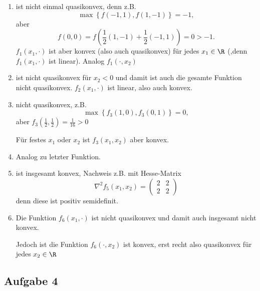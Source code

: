 \begin{enumerate}[label=\underline{f_{\arabic{enumi}}}:]
	\item ist nicht einmal quasikonvex, denn z.B.
		\[
			\max\limits_{}\left\{ f(-1,1), f(1,-1) \right\}  = -1
		,\] 
		aber
		\[
			f(0,0) = f(\frac{1}{2}(1,-1) + \frac{1}{2}(-1,1)) = 0 > -1
		.\] 
	 $f_1(x_1,\cdot)$ ist aber konvex (also auch quasikonvex) für jedes $x_1 \in \R$ (,denn $f_1(x_1, \cdot)$ ist linear). Analog $f_1(\cdot,x_2)$

	 \item ist nicht quasikonvex für $x_2<0$ und damit ist auch die gesamte Funktion nicht quasikonvex.
		 $f_{2}(x_1, \cdot)$ ist linear, also auch konvex.
	\item nicht quasikonvex, z.B.
		\[
			\max\limits_{}\left\{ f_3(1,0), f_3(0,1) \right\} = 0
		,\] 
		aber $f_3(\frac{1}{2},\frac{1}{2})=\frac{1}{16}> 0$

		Für festes $x_1$ oder $x_2$ ist $f_3(x_1,x_2)$ aber konvex.
	\item Analog zu letzter Funktion.
	\item ist insgesamt konvex, Nachweis z.B. mit Hesse-Matrix
		\[
			\nabla ^2f_5(x_1,x_2) = \begin{pmatrix}
				2 & 2 \\ 2 & 2
			\end{pmatrix}
		\] 
		denn diese ist positiv semidefinit.
	\item Die Funktion $f_6(x_1, \cdot)$ ist nicht quasikonvex und damit auch insgesamt nicht konvex.

		Jedoch ist die Funktion $f_6(\cdot, x_2)$ ist konvex, erst recht also quasikonvex für jedes $x_2 \in \R$
\end{enumerate}



\subsection*{Aufgabe 4}
\label{sec:Aufgabe 4}

